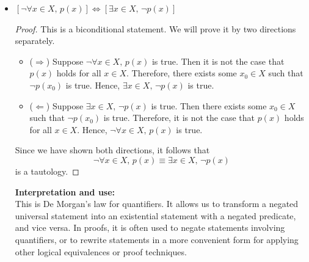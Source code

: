 \begin{solutions*}
\begin{itemize}
        \textbf{Interpretation and use: }\\
        This is De Morgan's law for conjunction. In a proof, it allows us to replace a negated conjunction with a disjunction of negations, and vice versa. For instance, to prove that a conjunction is false, it suffices to show that at least one conjunct is false. It is frequently used in proof by cases and in transforming logical statements into a more convenient form.

        \item $[\neg \forall x \in X,\, p(x)] \Leftrightarrow [\exists x \in X,\, \neg p(x)]$
        \begin{proof}
            This is a biconditional statement. We will prove it by two directions separately.
            \begin{itemize}
                \item ($\Rightarrow$) Suppose $\neg \forall x \in X,\, p(x)$ is true. Then it is not the case that $p(x)$ holds for all $x \in X$. Therefore, there exists some $x_0 \in X$ such that $\neg p(x_0)$ is true. Hence, $\exists x \in X,\, \neg p(x)$ is true.
                \item ($\Leftarrow$) Suppose $\exists x \in X,\, \neg p(x)$ is true. Then there exists some $x_0 \in X$ such that $\neg p(x_0)$ is true. Therefore, it is not the case that $p(x)$ holds for all $x \in X$. Hence, $\neg \forall x \in X,\, p(x)$ is true.
            \end{itemize}
            Since we have shown both directions, it follows that
            \[\neg \forall x \in X,\, p(x) \equiv \exists x \in X,\, \neg p(x)\]
            is a tautology.
        \end{proof}

        \textbf{Interpretation and use: }\\
        This is De Morgan's law for quantifiers. It allows us to transform a negated universal statement into an existential statement with a negated predicate, and vice versa. In proofs, it is often used to negate statements involving quantifiers, or to rewrite statements in a more convenient form for applying other logical equivalences or proof techniques.
    \end{itemize}
\end{solutions*}

